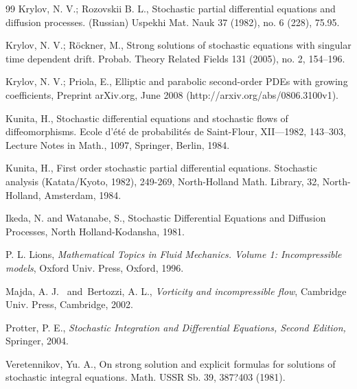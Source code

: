 \documentclass[a4paper,10pt]{article}
\begin{document}
\begin{thebibliography}{99}
Krylov, N. V.; Rozovskii B. L., Stochastic partial differential
equations and diffusion processes. (Russian) Uspekhi Mat. Nauk 37 (1982), no.
6 (228), 75.95.

Krylov, N. V.; R\"{o}ckner, M., Strong solutions of stochastic
equations with singular time dependent drift. Probab. Theory Related Fields
131 (2005), no. 2, 154--196.


Krylov, N. V.;  Priola, E., Elliptic and parabolic
 second-order PDEs with growing coefficients,  Preprint
  arXiv.org, June
 2008   (http://arxiv.org/abs/0806.3100v1).


Kunita, H., Stochastic differential equations and stochastic flows
of diffeomorphisms. Ecole d'\'{e}t\'{e} de probabilit\'{e}s de Saint-Flour,
XII---1982, 143--303, Lecture Notes in Math., 1097, Springer, Berlin, 1984.

Kunita, H., First order stochastic partial differential
equations. Stochastic analysis (Katata/Kyoto, 1982), 249-269,
North-Holland Math. Library, 32, North-Holland, Amsterdam, 1984.

Ikeda, N. and Watanabe, S., { Stochastic Differential Equations
and Diffusion Processes,} North Holland-Kodansha, 1981.

P. L. Lions, \textit{Mathematical Topics in Fluid Mechanics.
Volume 1: Incompressible models}, Oxford Univ. Press, Oxford, 1996.


Majda, A. J. \ and\ Bertozzi, A. L.,
  \textit{Vorticity and
incompressible flow}, Cambridge Univ. Press, Cambridge, 2002.
%

%

 Protter, P. E., \textit{ Stochastic Integration and Differential
Equations, Second Edition,} Springer, 2004.


Veretennikov, Yu. A., On strong solution and explicit formulas for
solutions of stochastic integral equations. Math. USSR Sb. 39, 387?403 (1981).
\end{thebibliography}
\end{document}
